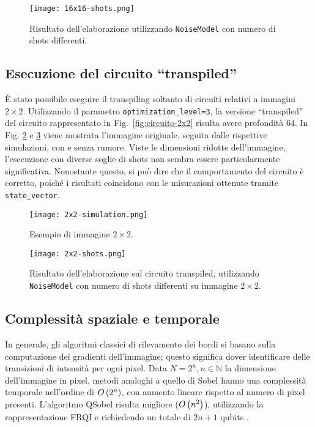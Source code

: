 \begin{figure}[ht]
	\centering
	\texttt{[image: 16x16-shots.png]}
	\caption{Risultato dell'elaborazione utilizzando \texttt{NoiseModel} con numero di shots differenti.}\label{fig:16x16-shots}
\end{figure}

\subsection{Esecuzione del circuito ``transpiled''}
È stato possibile eseguire il transpiling soltanto di circuiti relativi a
immagini $2 \times 2$. Utilizzando il
parametro \texttt{optimization\_level=3}, la versione ``transpiled'' del circuito
rappresentato in Fig.~\ref{fig:circuito-2x2} risulta avere profondità 64. 
In Fig. \ref{fig:2x2-simulation} e \ref{fig:2x2-shots} viene mostrata 
l'immagine originale, seguita dalle rispettive simulazioni, con e senza rumore.
Viste le dimensioni ridotte dell'immagine, l'esecuzione
con diverse soglie di shots non sembra essere particolarmente significativa.
Nonostante questo, si può dire che il comportamento del circuito è corretto, 
poiché i risultati coincidono con le misurazioni ottenute tramite \texttt{state\_vector}.

\begin{figure}[ht]
	\centering
	\texttt{[image: 2x2-simulation.png]}
	\caption{Esempio di immagine $2\times2$.}\label{fig:2x2-simulation}
\end{figure}

\begin{figure}[ht]
	\centering
	\texttt{[image: 2x2-shots.png]}
	\caption{Risultato dell'elaborazione sul circuito transpiled, 
	utilizzando \texttt{NoiseModel} con numero di shots differenti 
	su immagine $2\times2$.}\label{fig:2x2-shots}
\end{figure}

\subsection{Complessità spaziale e temporale}

In generale, gli algoritmi classici di rilevamento dei bordi si basano sulla
computazione dei gradienti dell'immagine; questo significa dover identificare
delle transizioni di intensità per ogni pixel. Data $N=2^n, n \in
\mathbb{N}$ la dimensione dell'immagine in pixel, metodi analoghi a quello di Sobel
hanno una complessità temporale nell'ordine di $O\left({2^n}\right)$, con aumento
lineare rispetto al numero di pixel presenti. L'algoritmo QSobel risulta
migliore ($O\left({n^2}\right)$), utilizzando la rappresentazione FRQI e
richiedendo un totale di $2n+1$ qubits \cite{qhed_frqi}.


